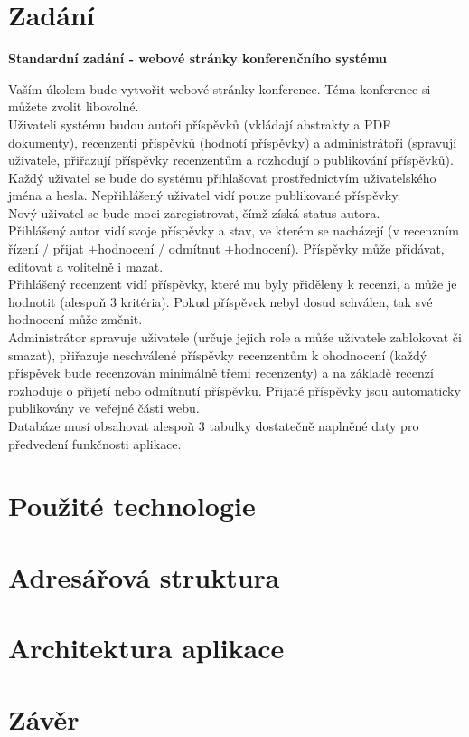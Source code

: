 \setlength{\parskip}{1em}

\chapter{Zadání}

\textbf{Standardní zadání - webové stránky konferenčního systému}

Vaším úkolem bude vytvořit webové stránky konference.  Téma konference si můžete zvolit libovolné.\\
Uživateli systému budou autoři příspěvků (vkládají abstrakty a PDF dokumenty), recenzenti příspěvků (hodnotí příspěvky) a administrátoři (spravují uživatele, přiřazují příspěvky recenzentům a rozhodují o publikování příspěvků). Každý uživatel se bude do systému přihlašovat prostřednictvím uživatelského jména a hesla. Nepřihlášený uživatel vidí pouze publikované příspěvky.\\
Nový uživatel se bude moci zaregistrovat, čímž získá status autora.\\
Přihlášený autor vidí svoje příspěvky a stav, ve kterém se nacházejí (v recenzním řízení / přijat +hodnocení / odmítnut +hodnocení). Příspěvky může přidávat, editovat a volitelně i mazat.\\
Přihlášený recenzent vidí příspěvky, které mu byly přiděleny k recenzi, a může je hodnotit (alespoň 3 kritéria). Pokud příspěvek nebyl dosud schválen, tak své hodnocení může změnit.\\
Administrátor spravuje uživatele (určuje jejich role a může uživatele zablokovat či smazat), přiřazuje neschválené příspěvky recenzentům k ohodnocení (každý příspěvek bude recenzován minimálně třemi recenzenty) a na základě recenzí rozhoduje o přijetí nebo odmítnutí příspěvku. Přijaté příspěvky jsou automaticky publikovány ve veřejné části webu.\\
Databáze musí obsahovat alespoň 3 tabulky dostatečně naplněné daty pro předvedení funkčnosti aplikace.



\chapter{Použité technologie}


\chapter{Adresářová struktura}

\chapter{Architektura aplikace}








\chapter{Závěr}

